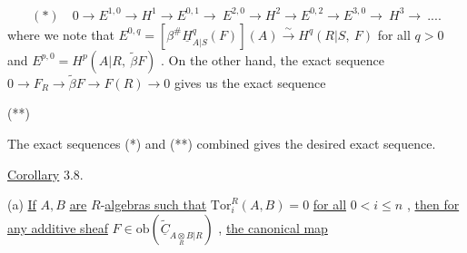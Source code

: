 \begin{equation*}
(*)\quad 0 \to E^{1,0} \to H^{1} \to E^{0,1}\!\to\ E^{2,0} \to H^{2} \to E^{0,2} \to E^{3,0}\!\to\ H^{3} \to\ ....
\end{equation*}
where we note that  $E^{0,q} = [\beta^{\#}\underline{H}^{q}_{A|S}(F)](A) \overset{\sim}{\to} H^{q}(R|S,\ F)$  for all  $q > 0$  and $E^{p,0} = H^{p}(A|R,\ \widetilde{\beta}F)$ . On the other hand, the exact sequence  $0 \to F_{R} \to \widetilde{\beta}F \to F(R) \to 0$ gives us the exact sequence

{\footnotesize (**)\quad{}}
The exact sequences (*) and (**) combined gives the desired exact sequence.



\underline{Corollary} 3.8.

(a)  \underline{If}  $A, B$  \underline{are} $R$-\underline{algebras such that}  $\mathrm{Tor}^{R}_{i}(A, B) = 0$  \underline{for all} $0 < i \leq n$  , \underline{then for any additive sheaf}  $F \in \mathrm{ob}(\widetilde{\underline{C}}_{A\underset{R}{\otimes}B|R})$  , \underline{the canonical map}

